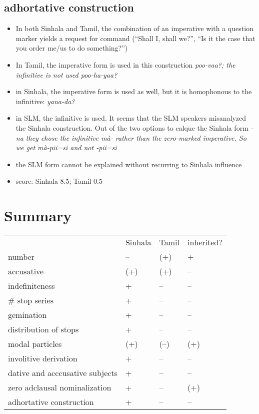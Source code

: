 \documentclass[a4paper,12pt]{article}
\begin{document}
 \subsection{adhortative construction}
\begin{itemize}
 \item In both Sinhala and Tamil, the combination of an imperative with a question marker yields a request for command (``Shall I, shall we?'', ``Is it the case that you order me/us to do something?'')
 \item In Tamil, the imperative form is used in this construction \em poo-vaa?\em; the infinitive is not used \em *poo-ha-yaa?\em
 \item in Sinhala, the imperative form is used as well, but it is homophonous to the infinitive: \em yan\dz a-da?\em
 \item in SLM, the infinitive is used. It seems that the SLM speakers misanalyzed the Sinhala construction. Out of the two options to calque the Sinhala form \em -n\dz a \em they chose the infinitive \em mà- \em rather than the zero-marked imperative. So we get \em mà-pii=si \em and not \em \zero-pii=si\em
\item the SLM form cannot be explained without recurring to Sinhala influence
 \item score: Sinhala 8.5; Tamil 0.5
\end{itemize}

\section{Summary}

\begin{center}
\begin{tabular}{llll}
 & Sinhala & Tamil &inherited?\\
number & -- & (+) & +\\
accusative & (+) & (+) & --  \\
indefiniteness & + & -- & --  \\
\# stop series & + & -- & --  \\
gemination & + & -- & --  \\
distribution of stops & + & -- & -- \\
modal particles & (+) & (--) & (+)\\
involitive derivation & + & -- & -- \\
dative and acccusative subjects & + & -- & --  \\
zero adclausal nominalization & + & -- & (+) \\
adhortative construction & + & -- & -- 
                \end{tabular}
                \end{center}
\end{document}
